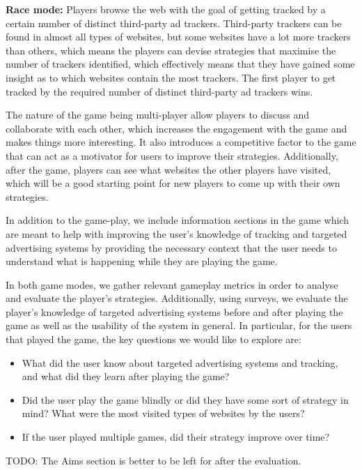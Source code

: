 \documentclass{l4proj}
\begin{document}
\textbf{Race mode:} Players browse the web with the goal of getting tracked by a certain number of distinct third-party ad trackers. Third-party trackers can be found in almost all types of websites, but some websites have a lot more trackers than others, which means the players can devise strategies that maximise the number of trackers identified, which effectively means that they have gained some insight as to which websites contain the most trackers. The first player to get tracked by the required number of distinct third-party ad trackers wins.

The nature of the game being multi-player allow players to discuss and collaborate with each other, which increases the engagement with the game and makes things more interesting. It also introduces a competitive factor to the game that can act as a motivator for users to improve their strategies.  Additionally, after the game, players can see what websites the other players have visited, which will be a good starting point for new players to come up with their own strategies.

In addition to the game-play, we include information sections in the game which are meant to help with improving the user's knowledge of tracking and targeted advertising systems by providing the necessary context that the user needs to understand what is happening while they are playing the game.     

In both game modes, we gather relevant gameplay metrics in order to analyse and evaluate the player's strategies. Additionally, using surveys, we evaluate the player's knowledge of targeted advertising systems before and after playing the game as well as the usability of the system in general. In particular, for the users that played the game, the key questions we would like to explore are:
\begin{itemize}
    \item
    What did the user know about targeted advertising systems and tracking, and what did they learn after playing the game?
    \item
    Did the user play the game blindly or did they have some sort of strategy in mind? What were the most visited types of websites by the users?
    \item
    If the user played multiple games, did their strategy improve over time?
\end{itemize}
TODO: The Aims section is better to be left for after the evaluation. 
\end{document}
